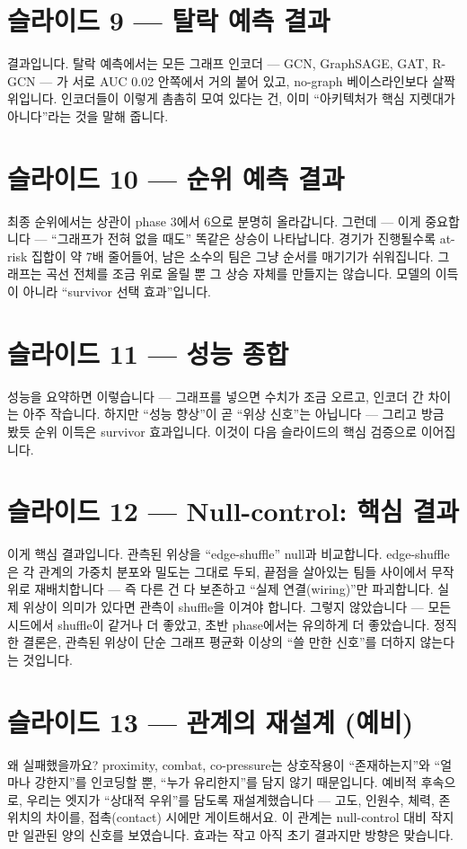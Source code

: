 \documentclass[11pt]{article}
\begin{document}
\section{슬라이드 9 --- 탈락 예측 결과}
결과입니다. 탈락 예측에서는 모든 그래프 인코더 --- GCN, GraphSAGE, GAT, R-GCN --- 가 서로 AUC 0.02 안쪽에서 거의 붙어 있고, no-graph 베이스라인보다 살짝 위입니다. 인코더들이 이렇게 촘촘히 모여 있다는 건, 이미 ``아키텍처가 핵심 지렛대가 아니다''라는 것을 말해 줍니다.

\section{슬라이드 10 --- 순위 예측 결과}
최종 순위에서는 상관이 phase 3에서 6으로 분명히 올라갑니다. 그런데 --- 이게 중요합니다 --- ``그래프가 전혀 없을 때도'' 똑같은 상승이 나타납니다. 경기가 진행될수록 at-risk 집합이 약 7배 줄어들어, 남은 소수의 팀은 그냥 순서를 매기기가 쉬워집니다. 그래프는 곡선 전체를 조금 위로 올릴 뿐 그 상승 자체를 만들지는 않습니다. 모델의 이득이 아니라 ``survivor 선택 효과''입니다.

\section{슬라이드 11 --- 성능 종합}
성능을 요약하면 이렇습니다 --- 그래프를 넣으면 수치가 조금 오르고, 인코더 간 차이는 아주 작습니다. 하지만 ``성능 향상''이 곧 ``위상 신호''는 아닙니다 --- 그리고 방금 봤듯 순위 이득은 survivor 효과입니다. 이것이 다음 슬라이드의 핵심 검증으로 이어집니다.

\section{슬라이드 12 --- Null-control: 핵심 결과}
이게 핵심 결과입니다. 관측된 위상을 ``edge-shuffle'' null과 비교합니다. edge-shuffle은 각 관계의 가중치 분포와 밀도는 그대로 두되, 끝점을 살아있는 팀들 사이에서 무작위로 재배치합니다 --- 즉 다른 건 다 보존하고 ``실제 연결(wiring)''만 파괴합니다. 실제 위상이 의미가 있다면 관측이 shuffle을 이겨야 합니다. 그렇지 않았습니다 --- 모든 시드에서 shuffle이 같거나 더 좋았고, 초반 phase에서는 유의하게 더 좋았습니다. 정직한 결론은, 관측된 위상이 단순 그래프 평균화 이상의 ``쓸 만한 신호''를 더하지 않는다는 것입니다.

\section{슬라이드 13 --- 관계의 재설계 (예비)}
왜 실패했을까요? proximity, combat, co-pressure는 상호작용이 ``존재하는지''와 ``얼마나 강한지''를 인코딩할 뿐, ``누가 유리한지''를 담지 않기 때문입니다. 예비적 후속으로, 우리는 엣지가 ``상대적 우위''를 담도록 재설계했습니다 --- 고도, 인원수, 체력, 존 위치의 차이를, 접촉(contact) 시에만 게이트해서요. 이 관계는 null-control 대비 작지만 일관된 양의 신호를 보였습니다. 효과는 작고 아직 초기 결과지만 방향은 맞습니다.
\end{document}
